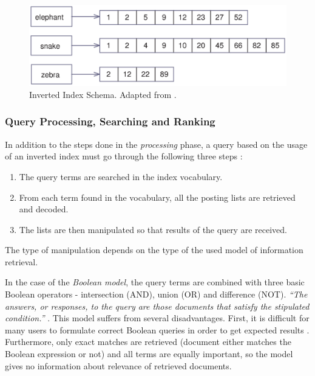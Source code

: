\begin{figure}[h!]
	\centering
		\includegraphics[width=1.00\textwidth]{figures/inverted_index.eps}
	\caption{Inverted Index Schema. Adapted from \cite{ManningRaghavanSchuetze08}.}
	\label{fig:inverted_index}
\end{figure}

	
\subsubsection{Query Processing, Searching and Ranking}

In addition to the steps done in the \textit{processing} phase, a query based on the usage of an inverted index must go through the following three steps \cite{MiddletonBaeza}:

\begin{enumerate}
	\item The query terms are searched in the index vocabulary.
	\item From each term found in the vocabulary, all the posting lists are retrieved and decoded.
	\item The lists are then manipulated so that results of the query are received.
\end{enumerate} 

The type of manipulation depends on the type of the used model of information retrieval.

In the case of the \textit{Boolean model}, the query terms are combined with three basic Boolean operators - intersection (AND), union (OR) and difference (NOT).
\textit{``The answers, or responses, to the query are those documents that satisfy the stipulated condition.''} \cite{Witten:1999:MGC:323905}.
This model suffers from several disadvantages.
First, it is difficult for many users to formulate correct Boolean queries in order to get expected results \cite{Salton:1989:ATP:77013}. 
Furthermore, only exact matches are retrieved (document either matches the Boolean expression or not) and all terms are equally important, so the model gives no information about relevance of retrieved documents. 
 
